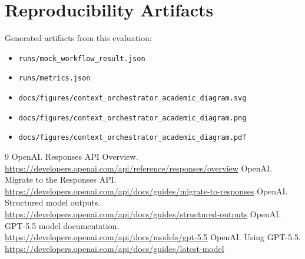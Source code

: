 \documentclass[11pt]{article}
\begin{document}
\section{Reproducibility Artifacts}

Generated artifacts from this evaluation:

\begin{itemize}
  \item \texttt{runs/mock\_workflow\_result.json}
  \item \texttt{runs/metrics.json}
  \item \texttt{docs/figures/context\_orchestrator\_academic\_diagram.svg}
  \item \texttt{docs/figures/context\_orchestrator\_academic\_diagram.png}
  \item \texttt{docs/figures/context\_orchestrator\_academic\_diagram.pdf}
\end{itemize}

\begin{thebibliography}{9}
 OpenAI. Responses API Overview. \url{https://developers.openai.com/api/reference/responses/overview}
 OpenAI. Migrate to the Responses API. \url{https://developers.openai.com/api/docs/guides/migrate-to-responses}
 OpenAI. Structured model outputs. \url{https://developers.openai.com/api/docs/guides/structured-outputs}
 OpenAI. GPT-5.5 model documentation. \url{https://developers.openai.com/api/docs/models/gpt-5.5}
 OpenAI. Using GPT-5.5. \url{https://developers.openai.com/api/docs/guides/latest-model}
\end{thebibliography}
\end{document}
